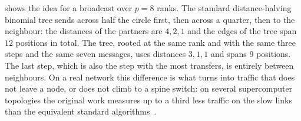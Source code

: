  shows the idea for a broadcast over $p=8$ ranks.
The standard distance-halving binomial tree sends across half the circle first, then across a quarter, then to the neighbour: the distances of the partners are $4,2,1$ and the edges of the tree span $12$ positions in total.
The \bine{} tree, rooted at the same rank and with the same three steps and the same seven messages, uses distances $3,1,1$ and spans $9$ positions.
The last step, which is also the step with the most transfers, is entirely between neighbours.
On a real network this difference is what turns into traffic that does not leave a node, or does not climb to a spine switch: on several supercomputer topologies the original work measures up to a third less traffic on the slow links than the equivalent standard algorithms~\cite{desensi2025bine}.

